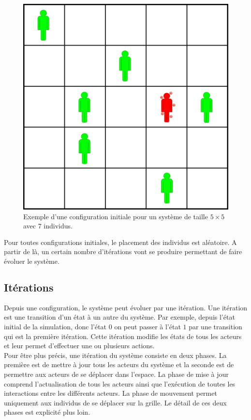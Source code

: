 \begin{figure}[h]
	\centering
	\captionsetup{justification=centering}
	\includegraphics[scale=0.5]{Images/configuration_initiale.png}
	\caption[Configuration initiale]{Exemple d'une configuration initiale pour un système de taille $5\times 5$ avec $7$ individus.}
\end{figure}

Pour toutes configurations initiales, le placement des individus est aléatoire. A partir de là, un certain nombre d'itérations vont se produire permettant de faire évoluer le système.

\subsection{Itérations}

Depuis une configuration, le système peut évoluer par une itération. Une itération est une transition d'un état à un autre du système. Par exemple, depuis l'état initial de la simulation, donc l'état $0$ on peut passer à l'état $1$ par une transition qui est la première itération. Cette itération modifie les états de tous les acteurs et leur permet d'effectuer une ou plusieurs actions.\\

Pour être plus précis, une itération du système consiste en deux phases. La première est de mettre à jour tous les acteurs du système et la seconde est de permettre aux acteurs de se déplacer dans l'espace. La phase de mise à jour comprend l'actualisation de tous les acteurs ainsi que l'exécution de toutes les interactions entre les différents acteurs. La phase de mouvement permet uniquement aux individus de se déplacer sur la grille. Le détail de ces deux phases est explicité plus loin.\\

